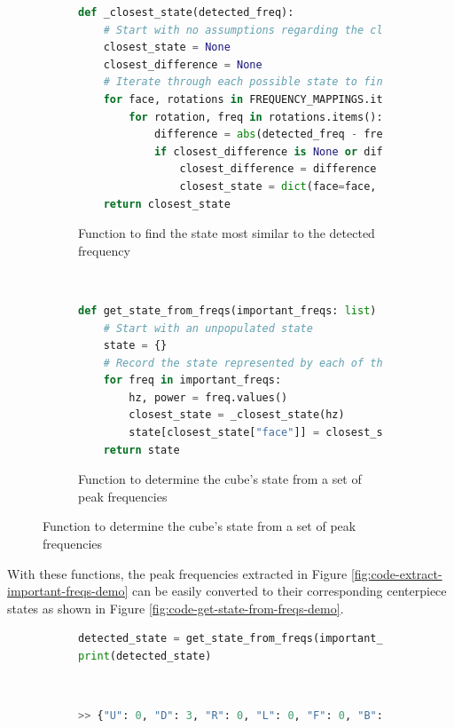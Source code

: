 \begin{figure}[h]
\caption{Converting peak frequencies to centerpiece states}
\label{fig:code-convert-peak-freqs-to-state}
\begin{subfigure}{\textwidth}
\caption{Function to find the state most similar to the detected frequency}
\label{fig:code-closest-state}
\begin{lstlisting}[language=Python]
def _closest_state(detected_freq):
    # Start with no assumptions regarding the closest state
    closest_state = None
    closest_difference = None
    # Iterate through each possible state to find the closest one
    for face, rotations in FREQUENCY_MAPPINGS.items():
        for rotation, freq in rotations.items():
            difference = abs(detected_freq - freq)
            if closest_difference is None or difference < closest_difference:
                closest_difference = difference
                closest_state = dict(face=face, rotation=rotation)
    return closest_state
\end{lstlisting}
\end{subfigure}\\

\begin{subfigure}{\textwidth}
\caption{Function to determine the cube's state from a set of peak frequencies}
\label{fig:code-get-state-from-freqs} 
\begin{lstlisting}[language=Python, firstnumber=last]
def get_state_from_freqs(important_freqs: list) -> dict:
    # Start with an unpopulated state
    state = {}
    # Record the state represented by each of the peak frequencies
    for freq in important_freqs:
        hz, power = freq.values()
        closest_state = _closest_state(hz)
        state[closest_state["face"]] = closest_state["rotation"]
    return state
\end{lstlisting}
\end{subfigure}
\end{figure}

With these functions, the peak frequencies extracted in Figure \ref{fig:code-extract-important-freqs-demo} can be easily converted to their corresponding centerpiece states as shown in Figure \ref{fig:code-get-state-from-freqs-demo}.

\begin{figure}[h]
\caption{Example conversion of peak frequencies to states}
\label{fig:code-get-state-from-freqs-demo} 
\begin{subfigure}{\textwidth}
\begin{lstlisting}[language=Python]
detected_state = get_state_from_freqs(important_freqs)
print(detected_state)
\end{lstlisting}
\end{subfigure}\\

\begin{subfigure}{\textwidth}
\begin{lstlisting}[language=Python, numbers=none]
>> {"U": 0, "D": 3, "R": 0, "L": 0, "F": 0, "B": 0}
\end{lstlisting}
\end{subfigure}
\end{figure}

